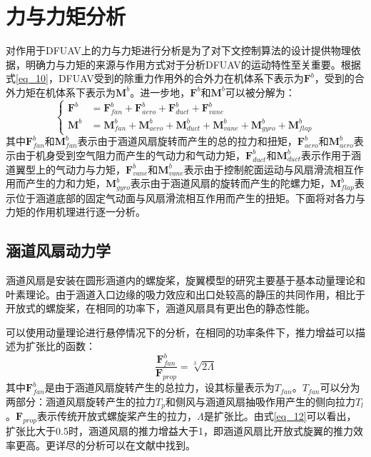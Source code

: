 \section{力与力矩分析}

对作用于DFUAV上的力与力矩进行分析是为了对下文控制算法的设计提供物理依据，明确力与力矩的来源与作用方式对于分析DFUAV的运动特性至关重要。根据式\eqref{eq_10}，DFUAV受到的除重力作用外的合外力在机体系下表示为$\boldsymbol{F}^b$，受到的合外力矩在机体系下表示为$\boldsymbol{M}^b$。进一步地，$\boldsymbol{F}^b$和$\boldsymbol{M}^b$可以被分解为：
\begin{equation}
    \left\{
    \begin{aligned}
        \boldsymbol{F}^b&=\boldsymbol{F}_{fan}^b+\boldsymbol{F}_{aero}^b+\boldsymbol{F}_{duct}^b+\boldsymbol{F}_{vane}^b \\
        \boldsymbol{M}^b&=\boldsymbol{M}_{fan}^b+\boldsymbol{M}_{aero}^b+\boldsymbol{M}_{duct}^b+\boldsymbol{M}_{vane}^b+\boldsymbol{M}_{gyro}^b+\boldsymbol{M}_{flap}^b
    \end{aligned}
\right.
\label{eq_11}
\end{equation}
其中$\boldsymbol{F}_{fan}^b$和$\boldsymbol{M}_{fan}^b$表示由于涵道风扇旋转而产生的总的拉力和扭矩，$\boldsymbol{F}_{aero}^b$和$\boldsymbol{M}_{aero}^b$表示由于机身受到空气阻力而产生的气动力和气动力矩，$\boldsymbol{F}_{duct}^b$和$\boldsymbol{M}_{duct}^b$表示作用于涵道翼型上的气动力与力矩，$\boldsymbol{F}_{vane}^b$和$\boldsymbol{M}_{vane}^b$表示由于控制舵面运动与风扇滑流相互作用而产生的力和力矩，$\boldsymbol{M}_{gyro}^b$表示由于涵道风扇的旋转而产生的陀螺力矩，$\boldsymbol{M}_{flap}^b$表示位于涵道底部的固定气动面与风扇滑流相互作用而产生的扭矩。下面将对各力与力矩的作用机理进行逐一分析。

\subsection{涵道风扇动力学}

涵道风扇是安装在圆形涵道内的螺旋桨，旋翼模型的研究主要基于基本动量理论和叶素理论。由于涵道入口边缘的吸力效应和出口处较高的静压的共同作用，相比于开放式的螺旋桨，在相同的功率下，涵道风扇具有更出色的静态性能。

可以使用动量理论进行悬停情况下的分析，在相同的功率条件下，推力增益可以描述为扩张比的函数：
\begin{equation}
    \dfrac{\boldsymbol{F}_{fan}^b}{\boldsymbol{F}_{prop}}={\sqrt[3]{2\Lambda}}
    \label{eq_12}
\end{equation}
其中$\boldsymbol{F}_{fan}^b$是由于涵道风扇旋转产生的总拉力，设其标量表示为$T_{fan}$。$T_{fan}$可以分为两部分：涵道风扇旋转产生的拉力$T_{p}$和侧风与涵道风扇抽吸作用产生的侧向拉力$T_{l}$。$\boldsymbol{F}_{prop}$表示传统开放式螺旋桨产生的拉力，$\Lambda$是扩张比。由式\eqref{eq_12}可以看出，扩张比大于0.5时，涵道风扇的推力增益大于1，即涵道风扇比开放式旋翼的推力效率更高。更详尽的分析可以在文献\parencite{pereiraHoverWindtunnelTesting2008}中找到。

